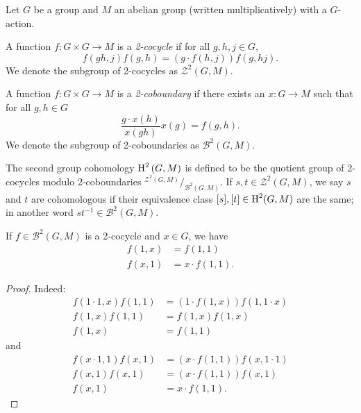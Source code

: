 \begin{definition}
  \label{def:second-group-coh}
  Let $G$ be a group and $M$ an abelian group (written multiplicatively) with a $G$-action.

  A function $f : G \times G \to M$ is a {\em 2-cocycle\/} if for all $g,h,j\in G$,
  \[
    f(gh, j)f(g, h) = \left(g\cdot f(h, j)\right) f(g, hj).
  \]
  We denote the subgroup of 2-cocycles as $\mathcal{Z}^{2}(G, M)$.

  A function $f : G\times G \to M$ is a {\em 2-coboundary\/} if there exists an $x : G \to M$ such that for all $g, h \in G$
  \[
    \frac{g\cdot x(h)}{x(gh)} x(g) = f(g, h).
  \]
  We denote the subgroup of 2-coboundaries as $\mathcal{B}^{2}(G, M)$.

  The second group cohomology $\operatorname{H}^{2}\left(G, M\right)$ is defined to be the quotient group of 2-cocycles modulo 2-coboundaries $^{\mathcal{Z}^{2}(G, M)}/_{\mathcal{B}^{2}(G, M)}$. If $s, t \in \mathcal{Z}^{2}(G, M)$, we say $s$ and $t$ are cohomologous if their equivalence class $[s], [t] \in \operatorname{H}^{2}(G, M)$ are the same; in another word $st^{-1}\in\mathcal{B}^{2}(G, M)$.
  \leanok
\end{definition}

\begin{lemma}\label{lem:2-cocycle-one-one}
  If $f \in \mathcal{B}^{2}(G, M)$ is a 2-cocycle and $x\in G$, we have
  \[
    \begin{aligned}
    f(1, x) &= f(1, 1) \\
    f(x, 1) &= x\cdot f(1, 1).
    \end{aligned}
  \]
\end{lemma}
\begin{proof}
  Indeed:
  \[
    \begin{aligned}
      f(1\cdot 1, x)f(1, 1) &= (1\cdot f(1,x))f(1, 1\cdot x)  \\
      f(1, x)f(1, 1) &= f(1, x) f(1,x) \\
      f(1, x) &= f(1,1)
    \end{aligned}
  \] and
  \[
    \begin{aligned}
      f(x\cdot 1, 1)f(x, 1) &= (x\cdot f(1, 1))f(x, 1\cdot 1)\\
      f(x, 1)f(x, 1) &= (x\cdot f(1, 1))f(x, 1)\\
      f(x, 1) &= x \cdot f(1, 1).
    \end{aligned}
  \]
  \leanok
\end{proof}

